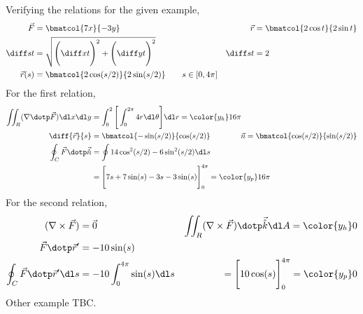 \begin{enumerate}
          Verifying the relations for the given example,
          \begin{align}
              \vec{F}                     & = \bmatcol{7x}{-3y}                &
              \vec{r}                     & = \bmatcol{2\cos t}{2\sin t}         \\
              \diff st                    & = \sqrt{\Bigg( \diff xt \Bigg)^2
              + \Bigg( \diff yt \Bigg)^2} &
              \diff st                    & = 2                                  \\
              \vec{r}(s)                  & = \bmatcol{2\cos(s/2)}{2\sin(s/2)}
              \qquad s \in [0, 4\pi]
          \end{align}
          For the first relation,
          \begin{align}
              \iint_R (\nabla \dotp \vec{F})
              \dl x \dl y                         & = \int_{0}^{2}
              \Bigg[ \int_{0}^{2\pi} 4r \dl \theta \Bigg]
              \dl r = \color{y_h} 16\pi                                               \\
              \diff {\vec{r}}{s}                  & = \bmatcol{-\sin(s/2)}{\cos(s/2)}
              \qquad \qquad \vec{n} = \bmatcol{\cos(s/2)}{\sin(s/2)}                  \\
              \oint_C \vec{F} \dotp \vec{\hat{n}} & = \oint
              14\cos^2 (s/2) - 6\sin^2(s/2) \dl s                                     \\
                                                  & = \Bigg[7s + 7\sin(s)
                  - 3s - 3\sin(s)\Bigg]_0^{4\pi} = \color{y_p} 16\pi
          \end{align}
          For the second relation,
          \begin{align}
              (\nabla \times \vec{F})              & = \vec{0}                    &
              \iint_R (\nabla \times \vec{F}) \dotp \vec{\hat{k}} \dl A
              = \color{y_h} 0                                                       \\
              \vec{F} \dotp \vec{r}'               & = -10\sin(s)                   \\
              \oint_C \vec{F} \dotp \vec{r}' \dl s & = -10\int_{0}^{4\pi} \sin(s)
              \dl s                                & = \Bigg[ 10\cos(s)
                  \Bigg]_0^{4\pi} = \color{y_p} 0
          \end{align}
          Other example TBC.


\end{enumerate}
